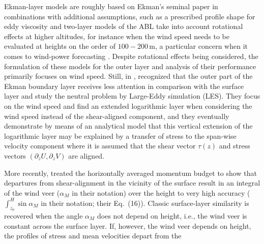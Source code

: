 \documentclass[smallcondensed,final]{svjour3}
\newcommand{\p}{\partial}
\begin{document}
%
%
\par %
%
Ekman-layer models are roughly based on Ekman's seminal \citeyear{ekman:AMA1905} paper in combinations with
additional assumptions, such as a prescribed profile shape for eddy viscosity \cite{ellison:QJR1955} and two-layer models of the ABL take into account rotational effects at higher altitudes,
for instance when the wind speed needs to be evaluated at heights on the order of $100-200\,\mathrm{m}$,
a particular concern when it comes to wind-power forecasting \citep{optis:BM2014}.
%
Despite rotational effects being considered, the formulation of these models for the outer layer
and analysis of their performance primarily focuses on wind speed.
% 
Still, in \citeyear{jiang:JAS2018}, \citeauthor{jiang:JAS2018} recognized that the outer
part of the Ekman boundary layer receives less attention in comparison with the surface layer
and study the neutral problem by Large-Eddy simulation (LES).
%
They focus on the wind speed and find an extended logarithmic layer when considering the wind
speed instead of the shear-aligned component, and they eventually demonstrate by means of
an analytical model that this vertical extension of the logarithmic layer may be explained
by a transfer of stress to the span-wise velocity component where it is assumed that the shear
vector $\tau(z)$ and stress vectors $(\p_zU,\p_zV)$ are aligned. 
%
\par
% 
More recently, \citet{ghannam:QJR2021} treated the horizontally averaged momentum budget to show
that departures from shear-alignment in the vicinity of the surface result in an integral of
the wind veer ($\alpha_M$ in their notation) over the height to very high accuracy ($\int_{z_0}^{H} \sin\alpha_M$ in their notation; their Eq.~(16)).
%
Classic surface-layer similarity is recovered when the angle $\alpha_M$ does not depend on height, i.e., the
wind veer is constant across the surface layer. 
%
If, however, the wind veer depends on height, the profiles of stress and mean velocities depart from the
\end{document}
